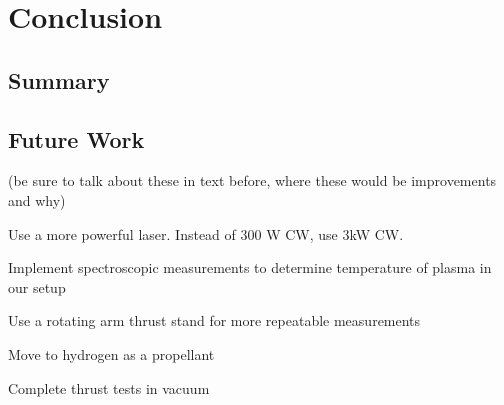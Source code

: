 \chapter{Conclusion}

    \section{Summary}


    \section{Future Work}
        (be sure to talk about these in text before, where these would be improvements and why)
        
        Use a more powerful laser. Instead of 300 W CW, use 3kW CW.
        
        Implement spectroscopic measurements to determine temperature of plasma in our setup
        
        Use a rotating arm thrust stand for more repeatable measurements
        
        Move to hydrogen as a propellant
        
        Complete thrust tests in vacuum
